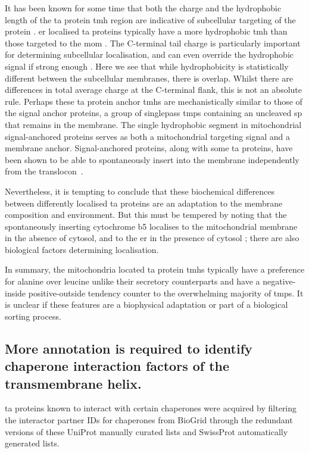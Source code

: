 It has been known for some time that both the charge and the hydrophobic length of the \gls{ta} protein \gls{tmh} region are indicative of subcellular targeting of the protein \cite{Borgese2007}.
\gls{er} localised \gls{ta} proteins typically have a more hydrophobic \gls{tmh} than those targeted to the \gls{mom} \cite{Wang2010}.
The C\--terminal tail charge is particularly important for determining subcellular localisation, and can even override the hydrophobic signal if strong enough \cite{Costello2017}.
Here we see that while hydrophobicity is statistically different between the subcellular membranes, there is overlap.
Whilst there are differences in total average charge at the C\--terminal flank, this is not an absolute rule.
Perhaps these \gls{ta} protein anchor \gls{tmh}s are mechanistically similar to those of the signal anchor proteins, a group of singlepass \gls{tmp}s containing an uncleaved \gls{sp} that remains in the membrane.
The single hydrophobic segment in mitochondrial signal\--anchored proteins serves as both a mitochondrial targeting signal and a membrane anchor.
Signal\--anchored proteins, along with some \gls{ta} proteins, have been shown to be able to spontaneously insert into the membrane independently from the translocon~\cite{Elisa2012, Lan2000, Colombo2009}.

Nevertheless, it is tempting to conclude that these biochemical differences between differently localised \gls{ta} proteins are an adaptation to the membrane composition and environment.
But this must be tempered by noting that the spontaneously inserting cytochrome b5 localises to the mitochondrial membrane in the absence of cytosol, and to the \gls{er} in the presence of cytosol \cite{Costa2018}; there are also biological factors determining localisation.

In summary, the mitochondria located \gls{ta} protein \gls{tmh}s typically have a preference for alanine over leucine unlike their secretory counterparts and have a negative\--inside positive\--outside tendency counter to the overwhelming majority of \gls{tmp}s.
It is unclear if these features are a biophysical adaptation or part of a biological sorting process.

\subsection{More annotation is required to identify chaperone interaction factors of the transmembrane helix.}

\gls{ta} proteins known to interact with certain chaperones were acquired by filtering the interactor partner IDs for chaperones from BioGrid through the redundant versions of these UniProt manually curated lists and SwissProt automatically generated lists.

